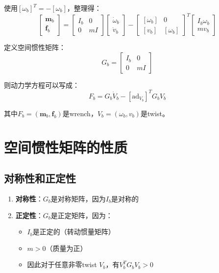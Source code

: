 \documentclass[12pt,a4paper]{article}
\begin{document}
使用$[\omega_b]^T = -[\omega_b]$，整理得：
\begin{equation}
\begin{bmatrix}
\bm{m}_b \\
\bm{f}_b
\end{bmatrix} = \begin{bmatrix}
I_b & 0 \\
0 & mI
\end{bmatrix} \begin{bmatrix}
\dot{\omega}_b \\
\dot{v}_b
\end{bmatrix} - \begin{bmatrix}
[\omega_b] & 0 \\
[v_b] & [\omega_b]
\end{bmatrix}^T \begin{bmatrix}
I_b \omega_b \\
m v_b
\end{bmatrix}
\end{equation}

定义空间惯性矩阵：
\begin{equation}
G_b = \begin{bmatrix}
I_b & 0 \\
0 & mI
\end{bmatrix}
\label{eq:G_final}
\end{equation}

则动力学方程可以写成：
\begin{equation}
F_b = G_b \dot{V}_b - [\text{ad}_{V_b}]^T G_b V_b
\label{eq:spatial_dynamics}
\end{equation}

其中$F_b = (\bm{m}_b, \bm{f}_b)$是wrench，$V_b = (\omega_b, v_b)$是twist。

\section{空间惯性矩阵的性质}

\subsection{对称性和正定性}

\begin{enumerate}
\item \textbf{对称性}：$G_b$是对称矩阵，因为$I_b$是对称的
\item \textbf{正定性}：$G_b$是正定矩阵，因为：
\begin{itemize}
\item $I_b$是正定的（转动惯量矩阵）
\item $m > 0$（质量为正）
\item 因此对于任意非零twist $V_b$，有$V_b^T G_b V_b > 0$
\end{itemize}
\end{enumerate}
\end{document}
